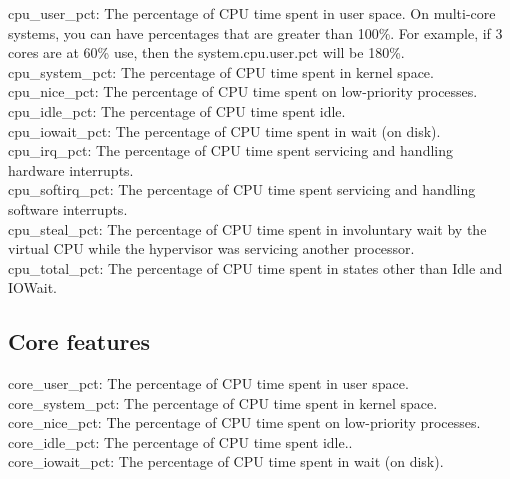 \documentclass{iosart2c}
\begin{document}
cpu\_user\_pct: The percentage of CPU time spent in user space. On multi-core systems, you can have percentages that are greater than 100\%. For example, if 3 cores are at 60\% use, then the system.cpu.user.pct will be 180\%.\\

cpu\_system\_pct: The percentage of CPU time spent in kernel space.\\

cpu\_nice\_pct: The percentage of CPU time spent on low-priority processes.\\

cpu\_idle\_pct: The percentage of CPU time spent idle.\\

cpu\_iowait\_pct: The percentage of CPU time spent in wait (on disk).\\

cpu\_irq\_pct: The percentage of CPU time spent servicing and handling hardware interrupts.\\

cpu\_softirq\_pct: The percentage of CPU time spent servicing and handling software interrupts.\\

cpu\_steal\_pct: The percentage of CPU time spent in involuntary wait by the virtual CPU while the hypervisor was servicing another processor.\\

cpu\_total\_pct: The percentage of CPU time spent in states other than Idle and IOWait.\\


\subsection{Core features}

core\_user\_pct: The percentage of CPU time spent in user space.\\

core\_system\_pct: The percentage of CPU time spent in kernel space.\\

core\_nice\_pct: The percentage of CPU time spent on low-priority processes.\\

core\_idle\_pct: The percentage of CPU time spent idle..\\

core\_iowait\_pct: The percentage of CPU time spent in wait (on disk).\\
\end{document}
